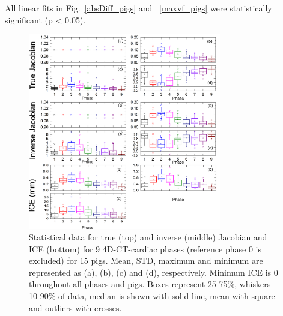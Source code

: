 \documentclass[type=dr, dr=rernat, accentcolor=tud7b,colorbacktitle, bigchapter, openright, twoside, 12pt ]{tudthesis}
\begin{document}
All linear fits in Fig.~\ref{absDiff_pigs} and ~\ref{maxvf_pigs} were statistically significant (p < 0.05).



\newpage

\begin{figure}[H]
	\begin{center}		
		\includegraphics[width=0.75\textwidth]{./Images/Jacobian_data_pigs.png}
		\caption{Statistical data for true (top) and inverse (middle) Jacobian and ICE (bottom) for 9 4D-CT-cardiac phases (reference phase 0 is excluded) for 15 pigs. Mean, STD, maximum and minimum are represented as (a), (b), (c) and (d), respectively.
		Minimum ICE is 0 throughout all phases and pigs. Boxes represent 25-75\%, whiskers 10-90\% of data, median is shown with solid line, mean with square and outliers with crosses.}
		\label{jacobian_data_pigs}
	\end{center}
\end{figure}

\newpage

\end{document}
